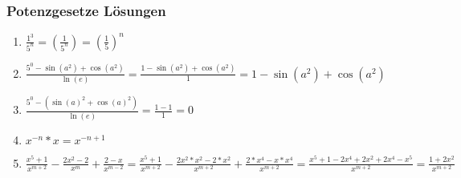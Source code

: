\begin{frame}
    \frametitle{Potenzgesetze Lösungen}
	\begin{enumerate}
		\vfill \item $\frac{1^3}{5^n} =  (\frac{1}{5^n}) = (\frac{1}{5})^n$
		\vfill \item $\frac{5^0- \sin(a^2) + \cos(a^2)}{\ln(e)} = \frac{1 - \sin(a^2) + \cos(a^2)}{1} = 1 - \sin(a^2) + \cos(a^2)$
		\vfill \item $\frac{5^0-( \sin(a)^2 + \cos(a)^2)}{\ln(e)} = \frac{1-1}{1} = 0$
		\vfill \item $x^{-n} * x = x^{-n+1}$
		\vfill \item $\frac{x^5 +1}{x^{m+2}} - \frac{2x^2-2}{x^m} + \frac{2-x}{x^{m-2}} = \frac{x^5+1}{x^{m+2}} - \frac{2x^2*x^2-2*x^2}{x^{m+2}} + \frac{2*x^4-x*x^4}{x^{m+2}}= \frac{x^5+1-2x^4+2x^2+2x^4-x^5}{x^{m+2}} = \frac{1+2x^2}{x^{m+2}}$
	\end{enumerate}
\end{frame}
